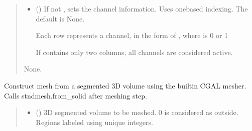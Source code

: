 \documentclass[letterpaper,10pt,english]{sphinxmanual}
\begin{document}
\begin{fulllineitems}
\begin{fulllineitems}
\begin{quote}
\begin{description}
\begin{itemize}
\item {} 
\sphinxAtStartPar
{} (\sphinxstyleliteralemphasis{\sphinxupquote{, }}) \textendash{} 
\sphinxAtStartPar
If not , sets the channel information. Uses one\sphinxhyphen{}based indexing. The default is None.

\sphinxAtStartPar
Each row represents a channel, in the form of , where  is 0 or 1

\sphinxAtStartPar
If  contains only two columns, all channels are considered active.


\end{itemize}

\sphinxAtStartPar
None.

\end{description}\end{quote}

\end{fulllineitems}


\begin{fulllineitems}
\label{\detokenize{_autosummary/nirfasterff.base.dcs_mesh.dcsmesh:nirfasterff.base.dcs_mesh.dcsmesh.from_volume}}
\pysigstartsignatures
\pysiglinewithargsret
{}
{\sphinxparamcomma {}\sphinxparamcomma {}\sphinxparamcomma {}\sphinxparamcomma {}\sphinxparamcomma {}}
{}
\pysigstopsignatures
\sphinxAtStartPar
Construct mesh from a segmented 3D volume using the built\sphinxhyphen{}in CGAL mesher. Calls stndmesh.from\_solid after meshing step.
\begin{quote}\begin{description}
\begin{itemize}
\item {} 
\sphinxAtStartPar
{} () \textendash{} 3D segmented volume to be meshed. 0 is considered as outside. Regions labeled using unique integers.


\end{itemize}
\end{description}
\end{quote}
\end{fulllineitems}
\end{fulllineitems}
\end{document}
